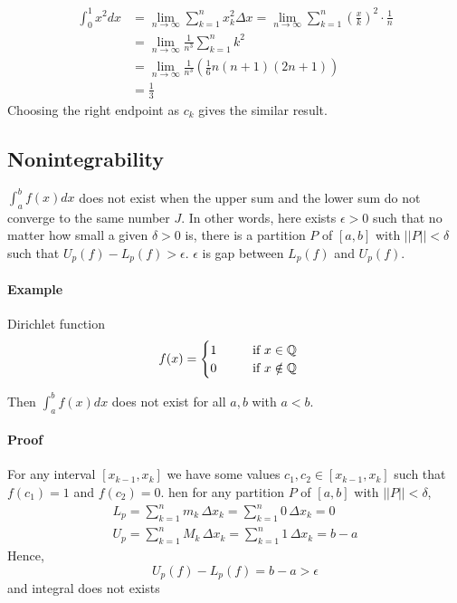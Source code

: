 \documentclass[12pt]{article}
\newcommand\tab[1][1cm]{\hspace*{#1}}
\begin{document}
\begin{align*} 
    \int_0^1 x^2 dx &= \lim_{n \to \infty} \sum_{k = 1}^n x_k^2 \Delta x = \lim_{n \to \infty} \sum_{k = 1}^n \left(\frac{x}{k}\right)^2 \cdot \frac{1}{n} \\
    &= \lim_{n \to \infty} \frac{1}{n^3} \sum_{k = 1}^n k^2 \\
    &= \lim_{n \to \infty} \frac{1}{n^3}(\frac{1}{6}n(n + 1)(2n + 1)) \\
    &= \frac{1}{3}
\end{align*}
Choosing the right endpoint as $c_k$ gives the similar result.

\subsection{Nonintegrability}
$\int_a^b f(x) dx$ does not exist when the upper sum and the lower sum do not converge to the 
same number $J$. In other words, here exists $\epsilon > 0$ such that no matter how small a given $\delta > 0$ is, 
there is a partition $P$ of $[a, b]$ with $||P|| < \delta$ such that $U_p(f) - L_p(f) > \epsilon$. $\epsilon$ is gap 
between $L_p(f)$ and $U_p(f)$.

\paragraph{Example} Dirichlet function
\begin{align*} 
     f(x) = 
     \begin{cases} 
        1 \textrm{\tab if } x \in \mathbb{Q} \\
        0 \textrm{\tab if } x \notin \mathbb{Q} \\
     \end{cases} 
\end{align*}

Then $\int_a^b f(x) dx$ does not exist for all $a, b$ with $a < b$.

\paragraph{Proof}
For any interval $[x_{k-1}, x_k]$ we have some values 
$c_1, c_2 \in [x_{k -1}, x_k]$ such that $f(c_1) = 1$ and $f(c_2) = 0$.
hen for any partition $P$ of $[a, b]$ with $||P|| < \delta$,
\begin{align*} 
     L_p = \sum_{k = 1}^n m_k \, \Delta x_k = \sum_{k = 1}^n 0 \, \Delta x_k = 0 \\
     U_p = \sum_{k = 1}^n M_k \, \Delta x_k = \sum_{k = 1}^n 1 \, \Delta x_k = b - a
\end{align*}
Hence, 
\[
    U_p(f) - L_p(f) = b - a > \epsilon
\]
and integral does not exists
\end{document}
